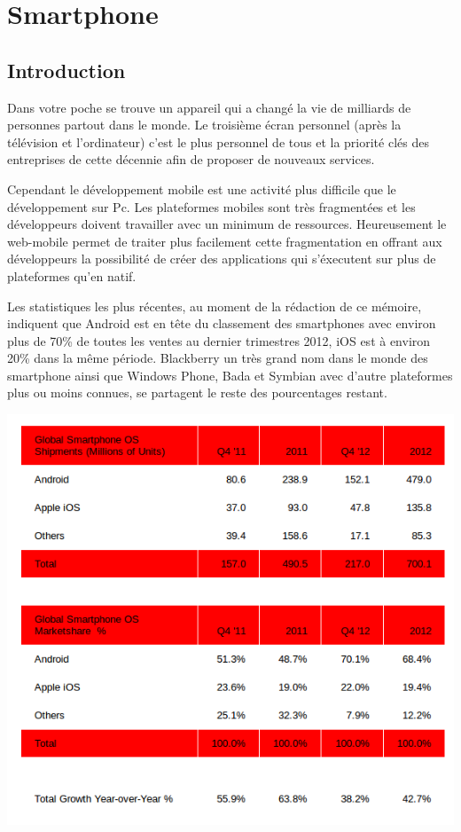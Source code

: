 \chapter{Smartphone}
\label{ch:smartphone}

\section{Introduction}

Dans votre poche se trouve un appareil qui a changé la vie de milliards de personnes partout dans le monde. Le troisième écran personnel (après la télévision et l’ordinateur) c'est le plus personnel de tous et la priorité clés des entreprises de cette décennie afin de proposer de nouveaux services.

Cependant le développement mobile est une activité plus difficile que le développement sur Pc. Les plateformes mobiles sont très fragmentées et les développeurs doivent travailler avec un minimum de ressources. Heureusement le web-mobile permet de traiter plus facilement cette fragmentation en offrant aux développeurs la possibilité de créer des applications qui s’éxecutent sur plus de plateformes qu’en natif.

Les statistiques les plus récentes, au moment de la rédaction de ce mémoire, indiquent que Android est en tête du classement des smartphones avec environ plus de 70\% de toutes les ventes au dernier trimestres 2012, iOS est à environ 20\% dans la même période. Blackberry un très grand nom dans le monde des smartphone ainsi que Windows Phone, Bada et Symbian avec d’autre plateformes plus ou moins connues, se partagent le reste des pourcentages restant.


\begin{center}
\includegraphics[width=14cm]{img/marche_smartphone.png}
\label{Parts de marché smartphone}
\end{center}

